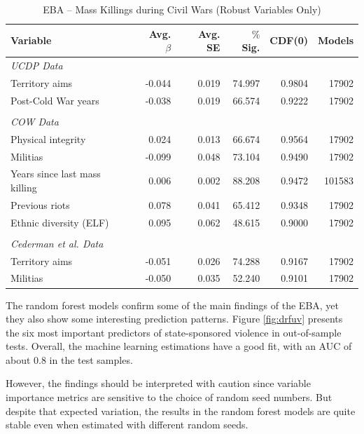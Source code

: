 \vspace{1cm}

\begin{table}[H]
\centering
\begin{tabular}{lrrrrr}
\hline
\textbf{Variable} & \textbf{Avg. $\beta$} & \textbf{Avg. SE} & \textbf{$\%$ Sig.} & \textbf{CDF(0)} & \textbf{Models} \\ \hline
\textit{UCDP Data} &  &  &  &  &  \\
Territory aims & -0.044 & 0.019 & 74.997 & 0.9804 & 17902 \\
Post-Cold War years & -0.038 & 0.019 & 66.574 & 0.9222 & 17902 \\
 &  &  &  &  &  \\
\textit{COW Data} &  &  &  &  &  \\
Physical integrity & 0.024 & 0.013 & 66.674 & 0.9564 & 17902 \\
Militias & -0.099 & 0.048 & 73.104 & 0.9490 & 17902 \\
Years since last mass killing & 0.006 & 0.002 & 88.208 & 0.9472 & 101583 \\
Previous riots & 0.078 & 0.041 & 65.412 & 0.9348 & 17902 \\
Ethnic diversity (ELF) & 0.095 & 0.062 & 48.615 & 0.9000 & 17902 \\
 &  &  &  &  &  \\
\textit{Cederman et al. Data} &  &  &  &  &  \\
Territory aims & -0.051 & 0.026 & 74.288 & 0.9167 & 17902 \\
Militias & -0.050 & 0.035 & 52.240 & 0.9101 & 17902 \\ \hline
\end{tabular}
\caption{EBA -- Mass Killings during Civil Wars (Robust Variables Only)}
\label{tab:ucdp}
\end{table}

The random forest models confirm some of the main findings of the EBA, yet they also show some interesting prediction patterns. Figure \ref{fig:drfuv} presents the six most important predictors of state-sponsored violence in out-of-sample tests. Overall, the machine learning estimations have a good fit, with an AUC of about 0.8 in the test samples.

However, the findings should be interpreted with caution since variable importance metrics are sensitive to the choice of random seed numbers. But despite that expected variation, the results in the random forest models are quite stable even when estimated with different random seeds. 

